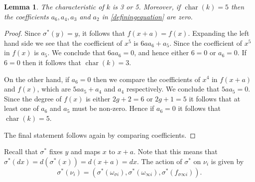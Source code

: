 \documentclass[draft, 11pt]{article} %
\theoremstyle{plain}
\newtheorem{lem}[defn]{Lemma}
\theoremstyle{remark}
\DeclareMathOperator{\cha}{char}
\begin{document}
\begin{lem}
The characteristic of $k$ is 3 or 5. 
Moreover, if $\cha(k)=5$ then the coefficients $a_6, a_4, a_3$ and $a_2$ in \eqref{definingequation} are zero.
\end{lem}
\begin{proof}
Since $\sigma^*(y) = y$, it follows that $f(x+a) = f(x)$.
Expanding the left hand side we see that the coefficient of $x^5$ is $6aa_6 + a_5$.
Since the coefficient of $x^5$ in $f(x)$ is $a_5$.
We conclude that $6aa_6 = 0$, and hence either $6=0$ or $a_6=0$.
If $6=0$ then it follows that $\cha (k)=3$.

On the other hand, if $a_6=0$ then we compare the coefficients of $x^4$ in $f(x+a)$ and $f(x)$, which are $5aa_5+a_4$ and $a_4$ respectively.
We conclude that $5aa_5=0$. Since the degree of $f(x)$ is either $2g+2=6$ or $2g+1=5$ it follows that at least one of $a_6$ and $a_5$ must be non-zero.
Hence if $a_6=0$ it follows that $\cha(k) = 5$.

The final statement follows again by comparing coefficients.
\end{proof}


Recall that $\sigma^*$ fixes $y$ and maps $x$ to $x+a$. 
Note that this means that $\sigma^*(dx) = d(\sigma^*(x)) = d(x+a) = dx$.
The action of $\sigma^*$ on $\nu_i$ is given by
\begin{equation*}
\sigma^*(\nu_i) = \left( \sigma^*( \omega_{\sigma i}), \sigma^*(\omega_{\infty i}), \sigma^*( f_{\sigma \infty i})\right).
\end{equation*}
\end{document}
